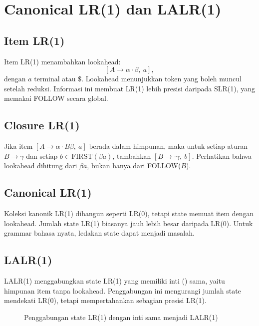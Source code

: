 \section{Canonical LR(1) dan LALR(1)}
\label{sec:ch12-lr1}

\subsection{Item LR(1)}

Item LR(1) menambahkan lookahead:
\[
[A \to \alpha \cdot \beta,\ a],
\]
dengan \(a\) terminal atau \(\$\). Lookahead menunjukkan token yang
boleh muncul setelah reduksi. Informasi ini membuat LR(1) lebih
presisi daripada SLR(1), yang memakai FOLLOW secara global.

\subsection{Closure LR(1)}

Jika item \([A \to \alpha \cdot B \beta,\ a]\) berada dalam
himpunan, maka untuk setiap aturan \(B \to \gamma\) dan setiap
\(b \in \text{FIRST}(\beta a)\), tambahkan
\([B \to \cdot \gamma,\ b]\). Perhatikan bahwa lookahead dihitung
dari \(\beta a\), bukan hanya dari FOLLOW(\(B\)).

\subsection{Canonical LR(1)}

Koleksi kanonik LR(1) dibangun seperti LR(0), tetapi state memuat
item dengan lookahead. Jumlah state LR(1) biasanya jauh lebih besar
daripada LR(0). Untuk grammar bahasa nyata, ledakan state dapat
menjadi masalah.

\subsection{LALR(1)}

LALR(1) menggabungkan state LR(1) yang memiliki inti ()
sama, yaitu himpunan item tanpa lookahead. Penggabungan ini
mengurangi jumlah state mendekati LR(0), tetapi mempertahankan
sebagian presisi LR(1).

\begin{figure}[H]
\centering
{}
\caption{Penggabungan state LR(1) dengan inti sama menjadi LALR(1)}
\label{fig:ch12-lalr}
\end{figure}

